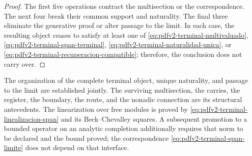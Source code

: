 \begin{proof}
The first five operations contract the multisection or the correspondence. The
next four break their common support and naturality. The final
three eliminate the generative proof or alter passage to the limit. In
each case, the resulting object ceases to satisfy at least one of
\eqref{eq:pdfv2-terminal-multivaluado},
\eqref{eq:pdfv2-terminal-span-terminal},
\eqref{eq:pdfv2-terminal-naturalidad-unica}, or
\eqref{eq:pdfv2-terminal-recuperacion-compatible}; therefore, the conclusion
does not carry over.
\end{proof}

\begin{statusbox}
The organization of the complete terminal object, unique naturality, and passage to the
limit are established jointly. The surviving multisection, the
carries, the register, the boundary, the route, and the nonadic connection are its
structural antecedents.\quad
The linearization over free modules is proved by
\eqref{eq:pdfv2-terminal-linealizacion-span} and its Beck--Chevalley
squares. A subsequent promotion to a bounded operator on an
analytic completion additionally requires that norm to be declared and the bound proved; the
correspondence \eqref{eq:pdfv2-terminal-span-limite} does not depend on that
interface.
\end{statusbox}
